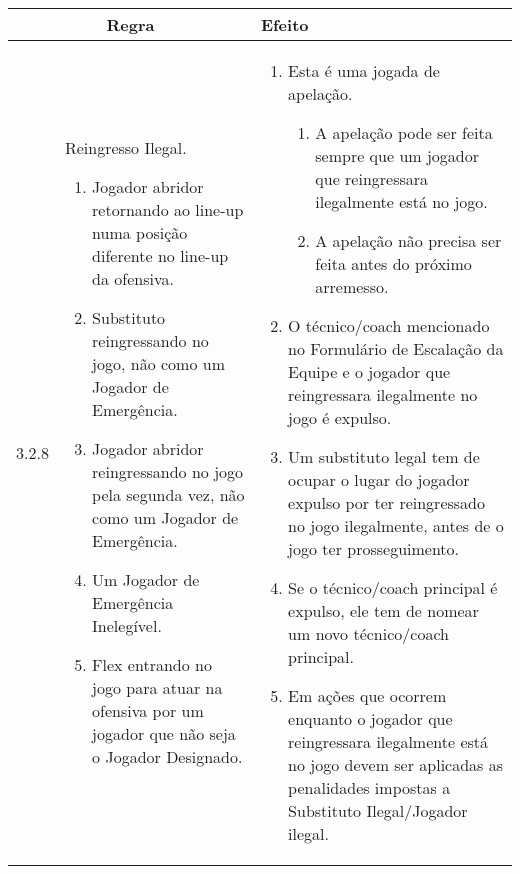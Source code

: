 {	\begin{tabular}{p{}p{}|p{}}
		\multicolumn{2}{c|}{Regra} & Efeito \\\hline\hline
		3.2.8 & Reingresso Ilegal.
		\begin{enumerate}[label=\alph*)]
			\item Jogador abridor retornando ao \gls{line-up} numa posi\c{c}\~ao diferente no \gls{line-up} da ofensiva. 
			
			\item  Substituto reingressando no jogo, n\~ao como um Jogador de Emerg\^encia.
			\item Jogador abridor reingressando no jogo pela segunda vez, n\~ao como um Jogador de Emerg\^encia. 
			\item  Um Jogador de Emerg\^encia Ineleg\'ivel. 
			\item  Flex entrando no jogo para atuar na ofensiva por um jogador que n\~ao seja o Jogador Designado. 
		\end{enumerate}
		
		&
		
		\begin{enumerate}[label=\alph*)]
			\item Esta \'e uma jogada de apela\c{c}\~ao. 
			\begin{enumerate}[label=\roman* -]
				\item A apela\c{c}\~ao pode ser feita sempre que um jogador que reingressara ilegalmente est\'a no jogo. 
				\item A apela\c{c}\~ao n\~ao precisa ser feita antes do pr\'oximo arremesso. 
			\end{enumerate}
			
			\item  O t\'ecnico/\gls{coach} mencionado no Formul\'ario de Escala\c{c}\~ao da Equipe e o jogador que reingressara ilegalmente no jogo \'e expulso. 
			
			\item  Um substituto legal tem de ocupar o lugar do jogador expulso por ter reingressado no jogo ilegalmente, antes de o jogo ter prosseguimento. 
			
			\item  Se o t\'ecnico/\gls{coach} principal \'e expulso, ele tem de nomear um novo t\'ecnico/\gls{coach} principal. 
			
			\item  Em a\c{c}\~oes que ocorrem enquanto o jogador que reingressara ilegalmente est\'a no jogo devem ser aplicadas as penalidades impostas a Substituto Ilegal/Jogador ilegal. 
		\end{enumerate}
		\\\hline
	\end{tabular}
}

